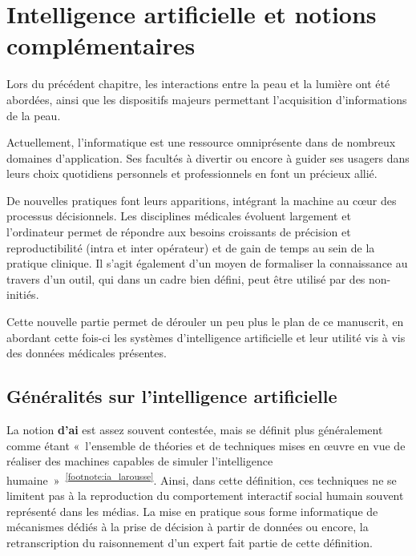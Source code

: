 \renewcommand{\thechapter}{\arabic{chapter}}
\setcounter{chapter}{2}

\chapter{Intelligence artificielle et notions complémentaires}
\label{chap:chapter_3}
\chapterintro
Lors du précédent chapitre, les interactions entre la peau et la lumière ont été abordées, ainsi que les dispositifs majeurs permettant l'acquisition d'informations de la peau.\par

Actuellement, l’informatique est une ressource omniprésente dans de nombreux domaines d’application. Ses facultés à divertir ou encore à guider ses usagers dans leurs choix quotidiens personnels et professionnels en font un précieux allié.\par 

De nouvelles pratiques font leurs apparitions, intégrant la machine au cœur des processus décisionnels. Les disciplines médicales évoluent largement et l’ordinateur permet de répondre aux besoins croissants de précision et reproductibilité (intra et inter opérateur) et de gain de temps au sein de la pratique clinique. Il s’agit également d’un moyen de formaliser la connaissance au travers d’un outil, qui dans un cadre bien défini, peut être utilisé par des non-initiés.\par

Cette nouvelle partie permet de dérouler un peu plus le plan de ce manuscrit, en abordant cette fois-ci les systèmes d'intelligence artificielle et leur utilité vis à vis des données médicales présentes.\par
\newpage

\section{Généralités sur l'intelligence artificielle}
\label{sec:artificial_intelligence}
La notion \textbf{d’\gls{ai}} est assez souvent contestée, mais se définit plus généralement comme étant «~l’ensemble de théories et de techniques mises en œuvre en vue de réaliser des machines capables de simuler l'intelligence humaine~»~\textsuperscript{\ref{footnote:ia_larousse}}. Ainsi, dans cette définition, ces techniques ne se limitent pas à la reproduction du comportement interactif social humain souvent représenté dans les médias. La mise en pratique sous forme informatique de mécanismes dédiés à la prise de décision à partir de données ou encore, la retranscription du raisonnement d'un expert fait partie de cette définition.\par

